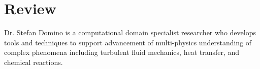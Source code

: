 \documentclass[letterpaper]{twentysecondcv_spd} %
\begin{document}
\begin{twentysingle} %
\end{twentysingle}

\section{Review}

Dr. Stefan Domino is a computational domain specialist researcher who develops tools and techniques
to support advancement of multi-physics understanding of complex phenomena including turbulent 
fluid mechanics, heat transfer, and chemical reactions. 
\end{document}
